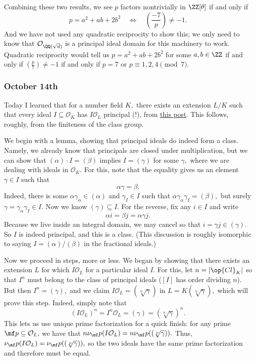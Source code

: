 Combining these two results, we see $p$ factors nontrivially in $\ZZ[\theta]$ if and only if
\[p=a^2+ab+2b^2\quad\iff\quad\left(\frac{-7}p\right)\ne-1.\]
And we have not used any quadratic reciprocity to show this; we only need to know that $\mathcal O_{\QQ(\sqrt d)}$ is a principal ideal domain for this machinery to work. Quadratic reciprocity would tell us $p=a^2+ab+2b^2$ for some $a,b\in\ZZ$ if and only if $\left(\frac p7\right)\ne-1$ if and only if $p=7$ or $p\equiv1,2,4\pmod7.$

\subsubsection{October 14th}
Today I learned that for a number field $K,$ there exists an extension $L/K$ such that every ideal $I\subseteq\mathcal O_K$ has $I\mathcal O_L$ principal (!), from \href{https://math.stackexchange.com/questions/294150/motivation-behind-the-definition-of-ideal-class-group?rq=1}{this post}. This follows, roughly, from the finiteness of the class group.

We begin with a lemma, showing that principal ideals do indeed form a class. Namely, we already know that principals are closed under multiplication, but we can show that $(\alpha)\cdot I=(\beta)$ implies $I=(\gamma)$ for some $\gamma,$ where we are dealing with ideals in $\mathcal O_K.$ For this, note that the equality gives us an element $\gamma\in I$ such that
\[\alpha\gamma=\beta.\]
Indeed, there is some $\alpha\gamma_\alpha\in(\alpha)$ and $\gamma_I\in I$ such that $\alpha\gamma_\alpha\gamma_I=(\beta),$ but surely $\gamma=\gamma_\alpha\gamma_I\in I.$ Now we know $(\gamma)\subseteq I.$ For the reverse, fix any $i\in I$ and write
\[\alpha i=\beta j=\alpha\gamma j.\]
Because we live inside an integral domain, we may cancel so that $i=\gamma j\in(\gamma).$ So $I$ is indeed principal, and this is a class. (This discussion is roughly isomorphic to saying $I=(\alpha)/(\beta)$ in the fractional ideals.)

Now we proceed in steps, more or less. We began by showing that there exists an extension $L$ for which $I\mathcal O_L$ for a particular ideal $I.$ For this, let $n=|\op{Cl}_K|$ so that $I^n$ must belong to the class of principal ideals ($[I]$ has order dividing $n$). But then $I^n=(\gamma),$ and we claim $I\mathcal O_L=(\sqrt[n]{\gamma})$ in $L=K(\sqrt[n]{\gamma}),$ which will prove this step. Indeed, simply note that
\[(I\mathcal O_L)^n=I^n\mathcal O_L=(\gamma)=(\sqrt[n]\gamma)^n.\]
This lets us use unique prime factorization for a quick finish: for any prime $\mf p\subseteq\mathcal O_L,$ we have that $n\nu_\mf p(I\mathcal O_L)=n\nu_\mf p((\sqrt[n]\gamma)).$ Thus, $\nu_\mf p(I\mathcal O_L)=\nu_\mf p((\sqrt[n]\gamma)),$ so the two ideals have the same prime factorization and therefore must be equal.


